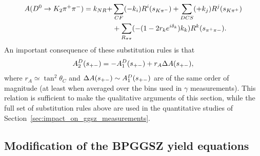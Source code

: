 \begin{align}\label{eq:amplitude_2}
\begin{split}
    A({{D}^0}\rightarrow K_2 \pi^+\pi^-) = k_{NR} + &\sum_{CF} (-k_i) R^i(s_{K\pi^-}) + \sum_{DCS} (+k_j) R^j(s_{K\pi^+}) \\
    &+ \sum_{R_{\pi\pi}} (-(1-2r_ke^{i\delta_k})k_k) R^k(s_{\pi^+\pi-}).
  \end{split}
\end{align}
An important consequence of these substitution rules is that
\begin{align}\label{eq:A1_A2_relation}
    A^{D}_2(s_{+-}) = -A^{D}_1(s_{+-})+r_A \Delta A(s_{+-}),
\end{align}
where $r_A\simeq\tan^2\theta_C $ and $\Delta A(s_{+-})\sim A^{D}_1(s_{+-})$ are of the same order of magnitude (at least when averaged over the bins used in $\gamma$ measurements). 
This relation is sufficient to make the qualitative arguments of this section, while the full set of substitution rules above are used in the quantitative studies of Section~\ref{sec:impact_on_ggsz_measurements}.


\subsection{Modification of the BPGGSZ yield equations} %
\label{sub:modification_of_the_bpggsz_yield_equations}




